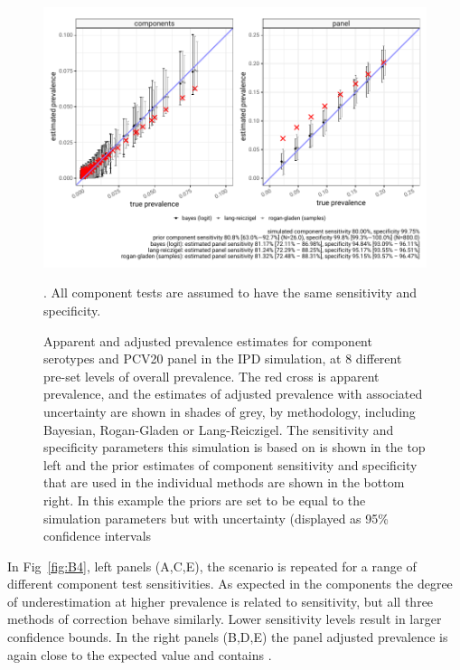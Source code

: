 \documentclass[a4paper, 12pt, twoside]{article}
\begin{document}
\begin{figure}[h!]
\centering
  \includegraphics{vignettes/latex/s2/fig/simulation_result_sens_80_80_v2}
  \caption{Apparent and adjusted prevalence estimates for component serotypes and PCV20 panel in the IPD simulation, at 8 different pre-set levels of overall prevalence. The red cross is apparent prevalence, and the estimates of adjusted prevalence with associated uncertainty are shown in shades of grey, by methodology, including Bayesian, Rogan-Gladen or Lang-Reiczigel. The sensitivity and specificity parameters this simulation is based on is shown in the top left and the prior estimates of component sensitivity and specificity that are used in the individual methods are shown in the bottom right. In this example the priors are set to be equal to the simulation parameters but with uncertainty (displayed as 95\% confidence intervals}. All component tests are assumed to have the same sensitivity and specificity.
\label{fig:B3}
\end{figure}

In Fig~\ref{fig:B4}, left panels (A,C,E), the scenario is repeated for a range of different component test sensitivities. As expected in the components the degree of underestimation at higher prevalence is related to sensitivity, but all three methods of correction behave similarly. Lower sensitivity levels result in larger confidence bounds. In the right panels (B,D,E) the panel adjusted prevalence is again close to the expected value and contains .
\end{document}
